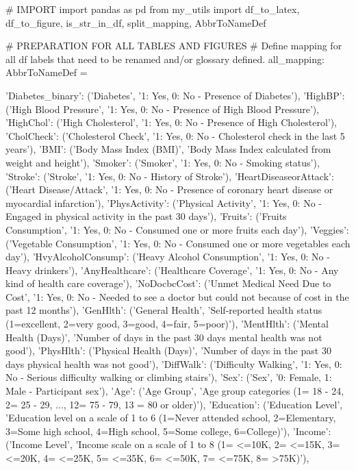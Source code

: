 \documentclass[11pt]{article}
\begin{document}
\begin{python}

# IMPORT
import pandas as pd
from my_utils import df_to_latex, df_to_figure, is_str_in_df, split_mapping, AbbrToNameDef

# PREPARATION FOR ALL TABLES AND FIGURES
# Define mapping for all df labels that need to be renamed and/or glossary defined.
all_mapping: AbbrToNameDef = {
    'Diabetes_binary': ('Diabetes', '1: Yes, 0: No - Presence of Diabetes'),
    'HighBP': ('High Blood Pressure', '1: Yes, 0: No - Presence of High Blood Pressure'),
    'HighChol': ('High Cholesterol', '1: Yes, 0: No - Presence of High Cholesterol'),
    'CholCheck': ('Cholesterol Check', '1: Yes, 0: No - Cholesterol check in the last 5 years'),
    'BMI': ('Body Mass Index (BMI)', 'Body Mass Index calculated from weight and height'),
    'Smoker': ('Smoker', '1: Yes, 0: No - Smoking status'),
    'Stroke': ('Stroke', '1: Yes, 0: No - History of Stroke'),
    'HeartDiseaseorAttack': ('Heart Disease/Attack', '1: Yes, 0: No - Presence of coronary heart disease or myocardial infarction'),
    'PhysActivity': ('Physical Activity', '1: Yes, 0: No - Engaged in physical activity in the past 30 days'),
    'Fruits': ('Fruits Consumption', '1: Yes, 0: No - Consumed one or more fruits each day'),
    'Veggies': ('Vegetable Consumption', '1: Yes, 0: No - Consumed one or more vegetables each day'),
    'HvyAlcoholConsump': ('Heavy Alcohol Consumption', '1: Yes, 0: No - Heavy drinkers'),
    'AnyHealthcare': ('Healthcare Coverage', '1: Yes, 0: No - Any kind of health care coverage'),
    'NoDocbcCost': ('Unmet Medical Need Due to Cost', '1: Yes, 0: No - Needed to see a doctor but could not because of cost in the past 12 months'),
    'GenHlth': ('General Health', 'Self-reported health status (1=excellent, 2=very good, 3=good, 4=fair, 5=poor)'),
    'MentHlth': ('Mental Health (Days)', 'Number of days in the past 30 days mental health was not good'),
    'PhysHlth': ('Physical Health (Days)', 'Number of days in the past 30 days physical health was not good'),
    'DiffWalk': ('Difficulty Walking', '1: Yes, 0: No - Serious difficulty walking or climbing stairs'),
    'Sex': ('Sex', '0: Female, 1: Male - Participant sex'),
    'Age': ('Age Group', 'Age group categories (1= 18 - 24, 2= 25 - 29, ..., 12= 75 - 79, 13 = 80 or older)'),
    'Education': ('Education Level', 'Education level on a scale of 1 to 6 (1=Never attended school, 2=Elementary, 3=Some high school, 4=High school, 5=Some college, 6=College)'),
    'Income': ('Income Level', 'Income scale on a scale of 1 to 8 (1= <=10K, 2= <=15K, 3= <=20K, 4= <=25K, 5= <=35K, 6= <=50K, 7= <=75K, 8= >75K)'),

}
\end{python}
\end{document}
